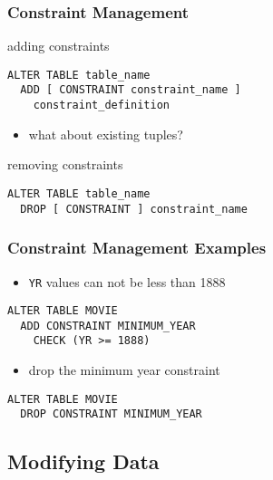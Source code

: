 \documentclass[dvipsnames]{beamer}
\theoremstyle{plain}
\begin{document}
\begin{frame}[fragile]
  \frametitle{Constraint Management}

  \begin{block}{adding constraints}
    \begin{lstlisting}
ALTER TABLE table_name
  ADD [ CONSTRAINT constraint_name ]
    constraint_definition
    \end{lstlisting}
  \end{block}

  \pause
  \begin{itemize}
    \item what about existing tuples?
  \end{itemize}

  \pause
  \begin{block}{removing constraints}
    \begin{lstlisting}
ALTER TABLE table_name
  DROP [ CONSTRAINT ] constraint_name
    \end{lstlisting}
  \end{block}
\end{frame}

\begin{frame}[fragile]
  \frametitle{Constraint Management Examples}

  \begin{example}
    \begin{itemize}
      \item \texttt{YR} values can not be less than 1888
    \end{itemize}

    \begin{lstlisting}
ALTER TABLE MOVIE
  ADD CONSTRAINT MINIMUM_YEAR
    CHECK (YR >= 1888)
    \end{lstlisting}

    \pause
    \begin{itemize}
      \item drop the minimum year constraint
    \end{itemize}

    \begin{lstlisting}
ALTER TABLE MOVIE
  DROP CONSTRAINT MINIMUM_YEAR
    \end{lstlisting}
  \end{example}
\end{frame}

\subsection{Modifying Data}
\end{document}
